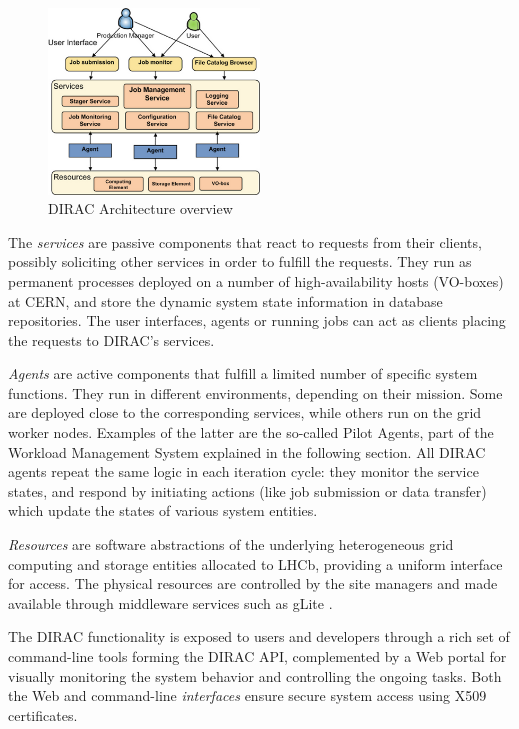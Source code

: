 \documentclass[sort&compress,preprint,3p]{elsarticle}
\begin{document}
\begin{figure}[tp]
\includegraphics[width=0.5\textwidth] {./Figure1.png}
\centering
\caption{DIRAC Architecture overview}
\label{fig:DIRAC-Arch}
\end{figure}
The \textit{services} are passive components that react to requests from their clients,
possibly soliciting other services in order to fulfill the requests. They run as
permanent processes deployed on a number of high-availability hosts (VO-boxes)
at CERN, and store the dynamic system state information in database
repositories. The user interfaces, agents or running jobs can act as clients
placing the requests to DIRAC's services.

\textit{Agents} are active components that fulfill a limited number of specific system
functions. They run in different environments, depending on their mission.
Some are deployed close to the corresponding services, while others run on the
grid worker nodes. Examples of the latter are the so-called Pilot Agents, part
of the Workload Management System explained in the following section. All DIRAC
agents repeat the same logic in each iteration cycle: they monitor the service states,
 and respond by initiating actions (like job
submission or data transfer) which update the states of various system
entities.

\textit{Resources} are software abstractions of the underlying heterogeneous grid
computing and storage entities allocated to LHCb, providing a uniform interface
for access. The physical resources are controlled by the site managers and made
available through middleware services such as gLite \cite{gLite}.

The DIRAC functionality is exposed to users and developers through a rich set of
command-line tools forming the DIRAC API, complemented by a Web portal for
visually monitoring  the system behavior and controlling the ongoing tasks. Both
the Web and command-line \textit{interfaces} ensure secure system access using X509
certificates. 
\end{document}
